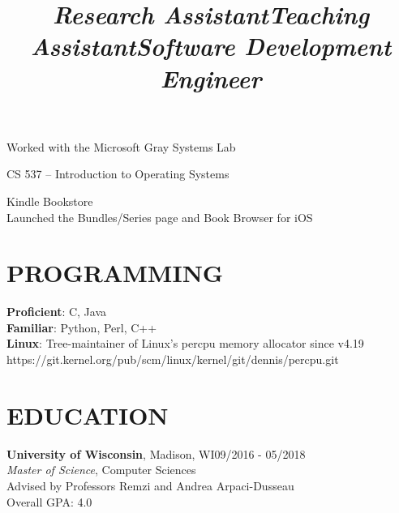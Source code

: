 \documentclass[margin,11pt]{res}
\begin{document}
\begin{resume}
\title{\sl{Research Assistant}}
\begin{position}
Worked with the Microsoft Gray Systems Lab
\end{position}

\vspace{-24pt}
\employer{}
\location{}
\title{\sl{Teaching Assistant}}
\begin{position}
CS 537 – Introduction to Operating Systems
\end{position}

\title{\sl{Software Development Engineer}}
\begin{position}
Kindle Bookstore\\
Launched the Bundles/Series page and Book Browser for iOS
\end{position}

\section{PROGRAMMING}

\textbf{Proficient}: C, Java\\
\textbf{Familiar}: Python, Perl, C++\\
\textbf{Linux}: Tree-maintainer of Linux's percpu memory allocator since v4.19\\
https://git.kernel.org/pub/scm/linux/kernel/git/dennis/percpu.git

\section{EDUCATION}
\textbf{University of Wisconsin}, Madison, WI\hfill 09/2016 - 05/2018\\
{\sl Master of Science}, Computer Sciences\\
Advised by Professors Remzi and Andrea Arpaci-Dusseau\\
Overall GPA: 4.0


\end{resume}
\end{document}
